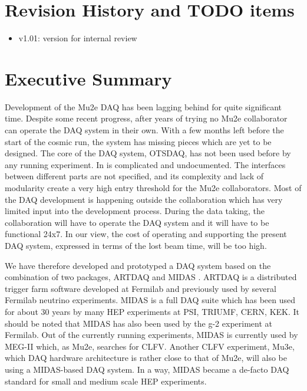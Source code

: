 \documentclass[12pt]{article}
\begin{document}
\newpage
\section {Revision History and TODO items}

\begin{itemize}
\item
  v1.01: version for internal review
\end{itemize}

% 
\newpage
\section {Executive Summary}

Development of the Mu2e DAQ has been lagging behind for quite significant time.
Despite some recent progress, after years of trying no Mu2e collaborator
can operate the DAQ system in their own. With a few months left before the start of the
cosmic run, the system has missing pieces which are yet to be designed.
%
The core of the DAQ system, OTSDAQ, has not been used before by any running experiment.
In is complicated and undocumented. The interfaces between different parts are not
specified, and its complexity and lack of modularity create a very high entry
threshold for the Mu2e collaborators.
%
Most of the DAQ development is happening outside the collaboration which has very
limited input into the development process.
%
During the data taking, the collaboration will have to operate the DAQ system
and it will have to be functional 24x7. In our view, the cost of operating 
and supporting the present DAQ system, expressed in terms of the lost beam time,
will be too high.

% 
We have therefore developed and prototyped a DAQ system based on the combination of two
packages, ARTDAQ \cite{2017_ARTDAQ_Biery} and MIDAS \cite{2025_MIDAS_WIKI}.
%
ARTDAQ is a distributed trigger farm software developed at Fermilab and previously
used by several Fermilab neutrino experiments. 
%
MIDAS is a full DAQ suite which has been used for about 30 years by many HEP experiments
at PSI, TRIUMF, CERN, KEK. It should be noted that MIDAS has also been used
by the g-2 experiment at Fermilab.
%
Out of the currently running experiments, MIDAS is currently used by MEG-II which,
as Mu2e,  searches for CLFV. Another CLFV experiment, Mu3e, which DAQ hardware architecture
is rather close to that of Mu2e, will also be using a MIDAS-based DAQ system.
In a way, MIDAS became a de-facto DAQ standard for small and medium scale HEP
experiments.
\end{document}
